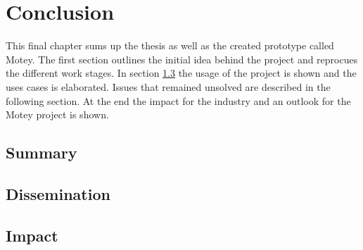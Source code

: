 \chapter{Conclusion}
\label{chapter:conclusion}
\minitoc\vspace{.5cm}
This final chapter sums up the thesis as well as the created prototype called Motey.
The first section outlines the initial idea behind the project and reprocues the different work stages.
In section \ref{section:summary_impact} the usage of the project is shown and the uses cases is elaborated.
Issues that remained unsolved are described in the following section.
At the end the impact for the industry and an outlook for the Motey project is shown.

\section{Summary}



\doit

\section{Dissemination}

\doit

\section{Impact}
\label{section:summary_impact}


